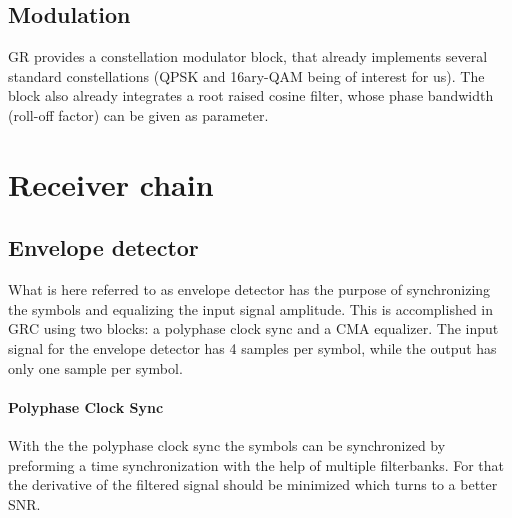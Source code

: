 \subsection{Modulation}

GR provides a constellation modulator block, that already implements several standard constellations (QPSK and 16ary-QAM being of interest for us). The block also already integrates a root raised cosine filter, whose phase bandwidth (roll-off factor) can be given as parameter.

\section{Receiver chain}

\subsection{Envelope detector}

What is here referred to as envelope detector has the purpose of synchronizing the symbols and equalizing the input signal amplitude. This is accomplished in GRC using two blocks: a polyphase clock sync and a CMA equalizer. The input signal for the envelope detector has 4 samples per symbol, while the output has only one sample per symbol.

\paragraph{Polyphase Clock Sync}
With the the polyphase clock sync the symbols can be synchronized by preforming a time synchronization with the help of multiple filterbanks. For that the derivative of the filtered signal should be minimized which turns to a better SNR. 

